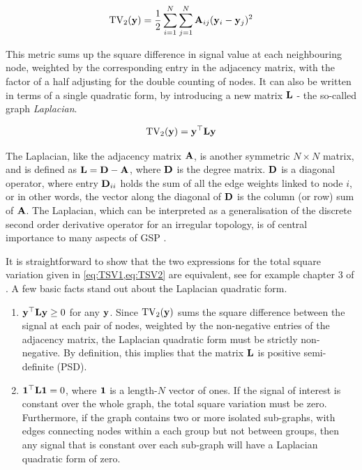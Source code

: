 \begin{equation}
    \label{eq:TSV1}
    \text{TV}_2(\mathbf{y}) = \frac{1}{2}\sum_{i=1}^N \sum_{j=1}^N \mathbf{A}_{ij} (\mathbf{y}_i - \mathbf{y}_j)^2
\end{equation}

This metric sums up the square difference in signal value at each neighbouring node, weighted by the corresponding entry in the adjacency matrix, with the factor of a half adjusting for the double counting of nodes. It can also be written in terms of a single quadratic form, by introducing a new matrix $\mathbf{L}$ - the so-called graph \textit{Laplacian}. 

\begin{equation}
    \label{eq:TSV2}
    \text{TV}_2(\mathbf{y}) = \mathbf{y}^\top \mathbf{L} \mathbf{y}
\end{equation}

The Laplacian, like the adjacency matrix $\mathbf{A}$, is another symmetric $N \times N$ matrix, and is defined as $\mathbf{L} = \mathbf{D} - \mathbf{A}$, where $\mathbf{D}$ is the degree matrix. $\mathbf{D}$ is a diagonal operator, where entry $\mathbf{D}_{ii}$ holds the sum of all the edge weights linked to node $i$, or in other words, the vector along the diagonal of $\mathbf{D}$ is the column (or row) sum of $\mathbf{A}$. The Laplacian, which can be interpreted as a generalisation of the discrete second order derivative operator for an irregular topology, is of central importance to many aspects of GSP \citep{Shuman2013}. 

\newpage

It is straightforward to show that the two expressions for the total square variation given in \cref{eq:TSV1,eq:TSV2} are equivalent, see for example chapter 3 of \cite{Ortega2022}. A few basic facts stand out about the Laplacian quadratic form.

\begin{enumerate}
    \item $\mathbf{y}^\top \mathbf{L} \mathbf{y} \geq 0$ for any $\mathbf{y}$. Since $\text{TV}_2(\mathbf{y})$ sums the square difference between the signal at each pair of nodes, weighted by the non-negative entries of the adjacency matrix, the Laplacian quadratic form must be strictly non-negative. By definition, this implies that the matrix $\mathbf{L}$ is positive semi-definite (PSD). 
    \item $\mathbf{1}^\top \mathbf{L} \mathbf{1} = 0$, where $\mathbf{1}$ is a length-$N$ vector of ones. If the signal of interest is constant over the whole graph, the total square variation must be zero. Furthermore, if the graph contains two or more isolated sub-graphs, with edges connecting nodes within a each group but not between groups, then any signal that is constant over each sub-graph will have a Laplacian quadratic form of zero. 
\end{enumerate}

